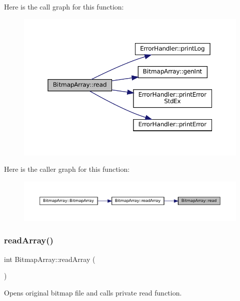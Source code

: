 Here is the call graph for this function\+:
\nopagebreak
\begin{figure}[H]
\begin{center}
\leavevmode
\includegraphics[width=350pt]{classBitmapArray_a3a5834d03cd095769b422d4d66b9435f_cgraph}
\end{center}
\end{figure}
Here is the caller graph for this function\+:
\nopagebreak
\begin{figure}[H]
\begin{center}
\leavevmode
\includegraphics[width=350pt]{classBitmapArray_a3a5834d03cd095769b422d4d66b9435f_icgraph}
\end{center}
\end{figure}
\mbox{\label{classBitmapArray_a4ce4b5acc896040075be63a559799e7e}} 
\subsubsection{\texorpdfstring{readArray()}{readArray()}}
{\footnotesize\ttfamily int Bitmap\+Array\+::read\+Array (\begin{DoxyParamCaption}{ }\end{DoxyParamCaption})}



Opens original bitmap file and calls private read function. 

